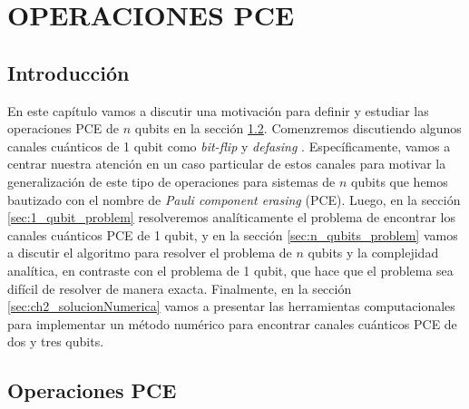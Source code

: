 \chapter{OPERACIONES PCE}

\section{Introducción} %

En este capítulo vamos a discutir 
una motivación para definir y estudiar las operaciones PCE de $n$ qubits en la 
sección \ref{sec:PCE_operations}. Comenzremos discutiendo algunos canales cuánticos 
de 1 qubit como \textit{bit-flip} y \textit{defasing} 
\cite{bengtsson_zyczkowski_2017,nielsen_chuang_2011}. 
Específicamente, vamos a centrar nuestra atención en un caso particular
de estos canales para motivar la generalización
de este tipo de operaciones para sistemas de $n$ qubits que hemos bautizado
con el nombre de \textit{Pauli component erasing} (PCE). 
Luego, en la sección \ref{sec:1_qubit_problem} resolveremos analíticamente 
el problema de encontrar los canales cuánticos PCE de 1 qubit, 
y en la sección \ref{sec:n_qubits_problem} vamos a discutir 
el algoritmo para resolver el problema de $n$ qubits y la complejidad analítica, 
en contraste con el problema de 1 qubit, que hace que el problema sea 
difícil de resolver de manera exacta. Finalmente, en la sección 
\ref{sec:ch2_solucionNumerica} vamos a presentar las herramientas computacionales 
para implementar un método numérico para encontrar canales cuánticos 
PCE de dos y tres qubits.

\section{Operaciones PCE} %
\label{sec:PCE_operations}

